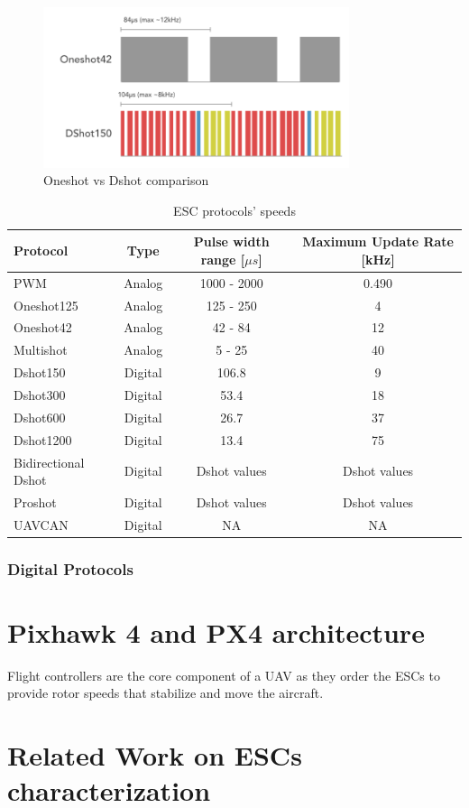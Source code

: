 \begin{figure}
    \centering
    \includegraphics[width=0.8\textwidth]{images/oneshot_dshot.png}
    \caption{Oneshot vs Dshot comparison \cite{BackyardRobotics2018}}
    \label{fig:oneshot_dshot}
\end{figure}

\begin{table}
\begin{center}
 \caption{ESC protocols' speeds}\vspace{1ex}
 \label{tab:tab_escs}
 \begin{tabular}{l|ccc}
 \hline
Protocol & Type & Pulse width range [$\mu s$] & Maximum Update Rate [kHz] \\ \hline \hline
PWM                 & Analog & 1000 - 2000  & 0.490\\
Oneshot125          & Analog & 125 - 250    & 4\\
Oneshot42           & Analog & 42 - 84      & 12\\
Multishot           & Analog & 5 - 25       & 40\\
Dshot150            & Digital & 106.8        & 9\\
Dshot300            & Digital & 53.4         & 18\\
Dshot600            & Digital & 26.7         & 37\\
Dshot1200           & Digital & 13.4         & 75\\
Bidirectional Dshot & Digital & Dshot values & Dshot values \\
Proshot             & Digital & Dshot values & Dshot values\\
UAVCAN              & Digital & NA           & NA\\
 \end{tabular}
\end{center}
\end{table}


\subsubsection{Digital Protocols}

\section{Pixhawk 4 and PX4 architecture}
Flight controllers are the core component of a UAV as they order the ESCs to provide rotor speeds that stabilize and move the aircraft. 

\section{Related Work on ESCs characterization}
